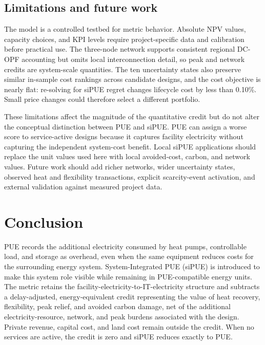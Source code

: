 \documentclass[preprint,12pt]{elsarticle}
\begin{document}
\subsection{Limitations and future work}
\label{sec:limitations}

The model is a controlled testbed for metric behavior. Absolute NPV values, capacity choices, and KPI levels require project-specific data and calibration before practical use. The three-node network supports consistent regional DC-OPF accounting but omits local interconnection detail, so peak and network credits are system-scale quantities. The ten uncertainty states also preserve similar in-sample cost rankings across candidate designs, and the cost objective is nearly flat: re-solving for siPUE regret changes lifecycle cost by less than 0.10\%. Small price changes could therefore select a different portfolio.

These limitations affect the magnitude of the quantitative credit but do not alter the conceptual distinction between PUE and siPUE. PUE can assign a worse score to service-active designs because it captures facility electricity without capturing the independent system-cost benefit. Local siPUE applications should replace the unit values used here with local avoided-cost, carbon, and network values. Future work should add richer networks, wider uncertainty states, observed heat and flexibility transactions, explicit scarcity-event activation, and external validation against measured project data.

\section{Conclusion}

PUE records the additional electricity consumed by heat pumps, controllable load, and storage as overhead, even when the same equipment reduces costs for the surrounding energy system. System-Integrated PUE (siPUE) is introduced to make this system role visible while remaining in PUE-compatible energy units. The metric retains the facility-electricity-to-IT-electricity structure and subtracts a delay-adjusted, energy-equivalent credit representing the value of heat recovery, flexibility, peak relief, and avoided carbon damage, net of the additional electricity-resource, network, and peak burdens associated with the design. Private revenue, capital cost, and land cost remain outside the credit. When no services are active, the credit is zero and siPUE reduces exactly to PUE.
\end{document}

